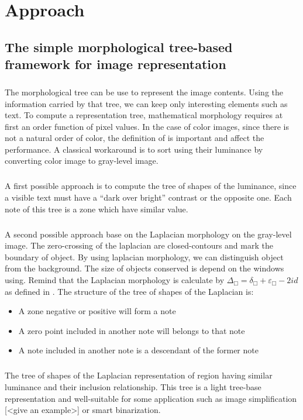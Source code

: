 
\graphicspath{ {1ChapterOurApproach/image/} }
\chapter{Approach} \label{Approach}
\section{The simple morphological tree-based framework for image representation}
\paragraph{}
The morphological tree can be use to represent the image contents. Using the information carried by that tree, we can keep only interesting elements such as text. To compute a representation tree, mathematical morphology requires at first an order function of pixel values. In the case of color images, since there is not a natural order of color, the definition of is important and affect the performance. A classical workaround is to sort using their luminance by converting color image to gray-level image. 
\paragraph{}
A first possible approach is to compute the tree of shapes of the luminance, since a visible text must have a “dark over bright” contrast or the opposite one. Each note of this tree is a zone which have similar value.
\paragraph{}
A second possible approach base on the Laplacian morphology on the gray-level image. The zero-crossing of the laplacian are closed-contours and mark the boundary of object. By using laplacian morphology, we can distinguish object from the background. The size of objects conserved is depend on the windows using. Remind that the Laplacian morphology is calculate by $ \Delta_\Box = \delta_\Box + \varepsilon_\Box -2id $ as defined in \cite{Vliet_anedge}. The structure of the tree of shapes of the Laplacian is:
\begin{itemize}
\item A zone negative or positive will form a note
\item A zero point included in another note will belongs to that note
\item A note included in another note is a descendant of the former note
\end{itemize}
\paragraph{}
The tree of shapes of the Laplacian representation of region having similar luminance and their inclusion relationship. This tree is a light tree-base representation and well-suitable for some application such as image simplification [<give an example>] or smart binarization. 
